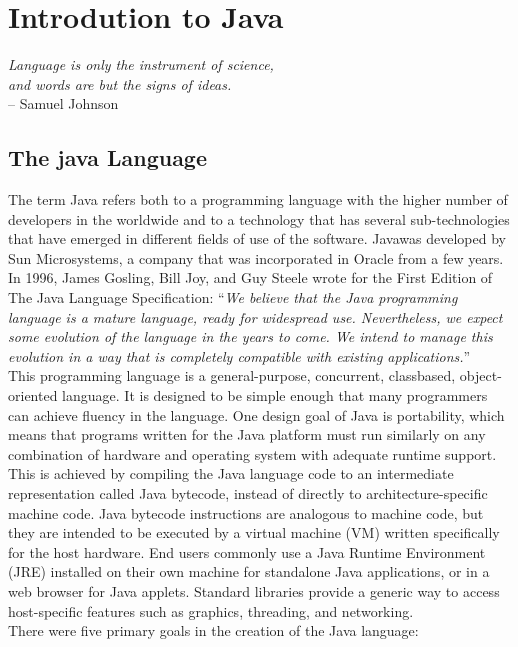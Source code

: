 \chapter{Introdution to Java}
\label{ch:java}


\begin{flushright}
	{\smaller
		\textit{Language is only the instrument of science, \\and words are but the signs of ideas.}\\
		-- Samuel Johnson}
\end{flushright}


\section{The java Language}
The term Java refers both to a programming language with the higher number of developers in the worldwide and to a technology that has several sub-technologies that have emerged in different fields of use of the software. Javawas developed by Sun Microsystems, a company that was incorporated in Oracle from a few years.
In 1996, James Gosling, Bill Joy, and Guy Steele wrote for the First Edition of The Java Language Specification:
``{\itshape We believe that the Java programming language is a mature language, ready for widespread use. Nevertheless, we expect some evolution of the language in the years to come. We intend to manage this evolution in a way that is completely compatible with existing applications.}''\\
This programming language is a general-purpose, concurrent, classbased, object-oriented language. It is designed to be simple enough that many programmers can achieve fluency in the language.\cite{javaoracle}
One design goal of Java is portability, which means that programs written for the Java platform must run similarly on any combination of hardware and operating system with adequate runtime support. This is achieved by compiling the Java language code to an intermediate representation called Java bytecode, instead of directly to architecture-specific machine code. Java bytecode instructions are analogous to machine code, but they are intended to be executed by a virtual machine (VM) written specifically for the host hardware. End users commonly use a Java Runtime Environment (JRE) installed on their own machine for standalone Java applications, or in a web browser for Java applets.\cite{wiki:java}
Standard libraries provide a generic way to access host-specific features such as graphics, threading, and networking.\\
There were five primary goals in the creation of the Java language:\cite{java}

